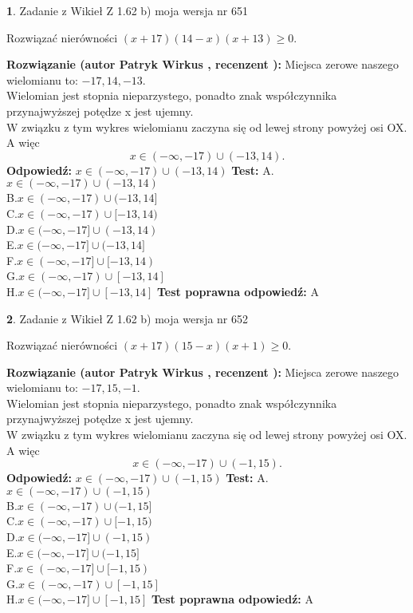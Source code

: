 \documentclass[12pt, a4paper]{article}
\theoremstyle{definition} %
\newtheorem{zad}{}
\newcommand{\zadStart}[1]{\begin{zad}#1\newline}
\newcommand{\zadStop}{\end{zad}}
\newcommand{\rozwStart}[2]{\noindent \textbf{Rozwiązanie (autor #1 , recenzent #2): }\newline}
\newcommand{\rozwStop}{\newline}
\newcommand{\odpStart}{\noindent \textbf{Odpowiedź:}\newline}
\newcommand{\odpStop}{\newline}
\newcommand{\testStart}{\noindent \textbf{Test:}\newline}
\newcommand{\testStop}{\newline}
\newcommand{\kluczStart}{\noindent \textbf{Test poprawna odpowiedź:}\newline}
\newcommand{\kluczStop}{\newline}
\begin{document}
\zadStart{Zadanie z Wikieł Z 1.62 b) moja wersja nr 651}

Rozwiązać nierówności $(x+17)(14-x)(x+13)\ge0$.
\zadStop
\rozwStart{Patryk Wirkus}{}
Miejsca zerowe naszego wielomianu to: $-17, 14, -13$.\\
Wielomian jest stopnia nieparzystego, ponadto znak współczynnika przy\linebreak najwyższej potędze x jest ujemny.\\ W związku z tym wykres wielomianu zaczyna się od lewej strony powyżej osi OX. A więc $$x \in (-\infty,-17) \cup (-13,14).$$
\rozwStop
\odpStart
$x \in (-\infty,-17) \cup (-13,14)$
\odpStop
\testStart
A.$x \in (-\infty,-17) \cup (-13,14)$\\
B.$x \in (-\infty,-17) \cup (-13,14]$\\
C.$x \in (-\infty,-17) \cup [-13,14)$\\
D.$x \in (-\infty,-17] \cup (-13,14)$\\
E.$x \in (-\infty,-17] \cup (-13,14]$\\
F.$x \in (-\infty,-17] \cup [-13,14)$\\
G.$x \in (-\infty,-17) \cup [-13,14]$\\
H.$x \in (-\infty,-17] \cup [-13,14]$
\testStop
\kluczStart
A
\kluczStop



\zadStart{Zadanie z Wikieł Z 1.62 b) moja wersja nr 652}

Rozwiązać nierówności $(x+17)(15-x)(x+1)\ge0$.
\zadStop
\rozwStart{Patryk Wirkus}{}
Miejsca zerowe naszego wielomianu to: $-17, 15, -1$.\\
Wielomian jest stopnia nieparzystego, ponadto znak współczynnika przy\linebreak najwyższej potędze x jest ujemny.\\ W związku z tym wykres wielomianu zaczyna się od lewej strony powyżej osi OX. A więc $$x \in (-\infty,-17) \cup (-1,15).$$
\rozwStop
\odpStart
$x \in (-\infty,-17) \cup (-1,15)$
\odpStop
\testStart
A.$x \in (-\infty,-17) \cup (-1,15)$\\
B.$x \in (-\infty,-17) \cup (-1,15]$\\
C.$x \in (-\infty,-17) \cup [-1,15)$\\
D.$x \in (-\infty,-17] \cup (-1,15)$\\
E.$x \in (-\infty,-17] \cup (-1,15]$\\
F.$x \in (-\infty,-17] \cup [-1,15)$\\
G.$x \in (-\infty,-17) \cup [-1,15]$\\
H.$x \in (-\infty,-17] \cup [-1,15]$
\testStop
\kluczStart
A
\kluczStop
\end{document}

